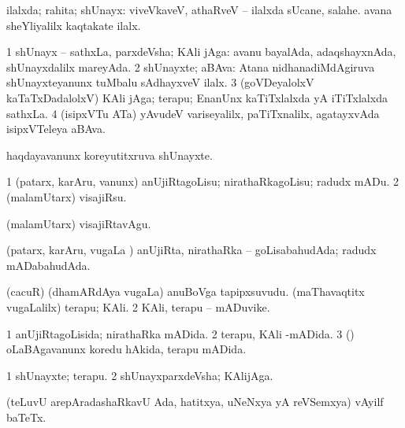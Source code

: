 \noindent 
\gl{\pagu}
\expl{}
\bmng
  ilalxda; rahita; shUnayx:  viveVkaveV, athaRveV -- ilalxda sUcane, salahe.  avana sheYliyalilx kaqtakate ilalx. 
\emng
\eentry

\bentry 
{} 
\gl{\nA}
\expl{}
\bmng
\bnum
\num{1} shUnayx -- sathxLa, parxdeVsha; KAli jAga:  avanu bayalAda, adaqshayxnAda, shUnayxdalilx mareyAda. 
\num{2} shUnayxte; aBAva:  Atana nidhanadiMdAgiruva shUnayxteyanunx tuMbalu sAdhayxveV ilalx. 
\num{3} (goVDeyalolxV kaTaTxDadalolxV) KAli jAga; terapu; EnanUnx kaTiTxlalxda yA iTiTxlalxda sathxLa. 
\num{4} (isipxVTu ATa) yAvudeV variseyalilx, paTiTxnalilx, agatayxvAda isipxVTeleya aBAva. 
\enum
\emng

\noindent 
\gl{\pagu}
\expl{}
\bmng
  haqdayavanunx koreyutitxruva shUnayxte. 
\emng
\eentry

\bentry
{} 
\gl{\sakirx}
\expl{}
\bmng
\bnum
\num{1} (patarx, karAru, \mo vanunx) anUjiRtagoLisu; nirathaRkagoLisu; radudx mADu. 
\num{2} (malamUtarx) visajiRsu. 
\enum
\emng

\noindent 
\gl{\akirx}
\expl{}
\bmng
 (malamUtarx) visajiRtavAgu. 
\emng
\eentry

\bentry 
{} 
\gl{\gu}
\expl{}
\bmng
 (patarx, karAru, \mo vugaLa \vi) anUjiRta, nirathaRka -- goLisabahudAda; radudx mADabahudAda. 
\emng
\eentry

\bentry 
{} 
\gl{\nA}
\expl{}
\bmng
\bnum
{} 
\banum
{} (cacuR) (dhamARdAya \mo vugaLa) anuBoVga tapipxsuvudu. 
 (maThavaqtitx \mo vugaLalilx) terapu; KAli. 
\eanum
\numie
\num{2} KAli, terapu -- mADuvike. 
\enum
\emng
\eentry

\bentry
{} 
\gl{\gu}
\expl{}
\bmng
\bnum
\num{1} anUjiRtagoLisida; nirathaRka mADida. 
\num{2} terapu, KAli -mADida. 
\num{3} (\vaMlAM) oLaBAgavanunx koredu hAkida, terapu mADida. 
\enum
\emng
\eentry

\bentry
{} 
\gl{\nA}
\expl{}
\bmng
\bnum
\num{1} shUnayxte; terapu. 
\num{2} shUnayxparxdeVsha; KAlijAga. 
\enum
\emng
\eentry

\bentry
{} 
\gl{\nA}
\expl{}
\bmng
 (teLuvU arepAradashaRkavU Ada, hatitxya, uNeNxya yA reVSemxya) vAyilf baTeTx. 
\emng
\eentry

